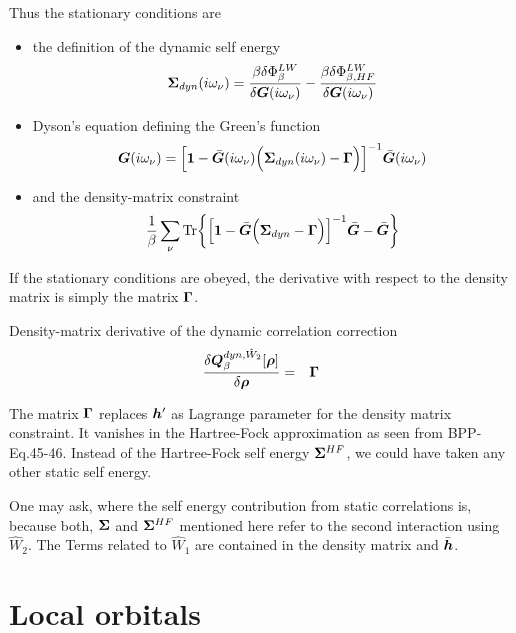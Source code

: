 \documentclass[11pt,a4paper]{report}
\begin{document}
Thus the stationary conditions are
\begin{itemize}
\item the definition of the dynamic self energy
\begin{eqnarray}
\bm{\Sigma}_{dyn}(i\omega_\nu)
=\frac{\beta\delta\Phi^{LW}_\beta}{\delta\bm{G}(i\omega_\nu)}
-\frac{\beta\delta\Phi^{LW}_{\beta,HF}}{\delta\bm{G}(i\omega_\nu)}
\end{eqnarray}
%
\item Dyson's equation defining the Green's function
\begin{eqnarray}
\bm{G}(i\omega_\nu)=\Bigl[\bm{1}-\bar{\bm{G}}(i\omega_\nu)
\Bigl(\bm{\Sigma}_{dyn}(i\omega_\nu)-\bm{\Gamma}\Bigr)\Bigr]^{-1}
\bar{\bm{G}}(i\omega_\nu)
\end{eqnarray}
%
\item and the density-matrix constraint
\begin{eqnarray}
\frac{1}{\beta}\sum_\nu\mathrm{Tr}\biggl\lbrace
\Bigl[\bm{1}-\bar{\bm{G}}
\Bigl(\bm{\Sigma}_{dyn}-\bm{\Gamma}\Bigr)\Bigr]^{-1}
\bar{\bm{G}}
-\bar{\bm{G}}
\biggr\rbrace
\end{eqnarray}
\end{itemize}
If the stationary conditions are obeyed, the derivative with respect
to the density matrix is simply the matrix $\bm{\Gamma}$.
\begin{myshadowminipage}{Density-matrix derivative of the dynamic correlation correction}
\begin{eqnarray}
\frac{\delta\bm{Q}^{dyn,\hat{W}_2}_\beta[\bm{\rho}]}{\delta\bm{\rho}}
&=&\bm{\Gamma}
\end{eqnarray}
\end{myshadowminipage}

The matrix $\bm{\Gamma}$ replaces $\bm{h}'$ as Lagrange parameter
for the density matrix constraint.  It vanishes in the Hartree-Fock
approximation as seen from
BPP-Eq.45-46\cite{bloechl13_prb88_25139}. Instead of the Hartree-Fock
self energy $\bm{\Sigma}^{HF}$, we could have taken any other static
self energy.

One may ask, where the self energy contribution from static
correlations is, because both, $\bm{\Sigma}$ and $\bm{\Sigma}^{HF}$
mentioned here refer to the second interaction using $\hat{W}_2$. The
Terms related to $\hat{W}_1$ are contained in the density matrix and
$\bar{\bm{h}}$.

%
\newpage
\section{Local orbitals}
\end{document}
